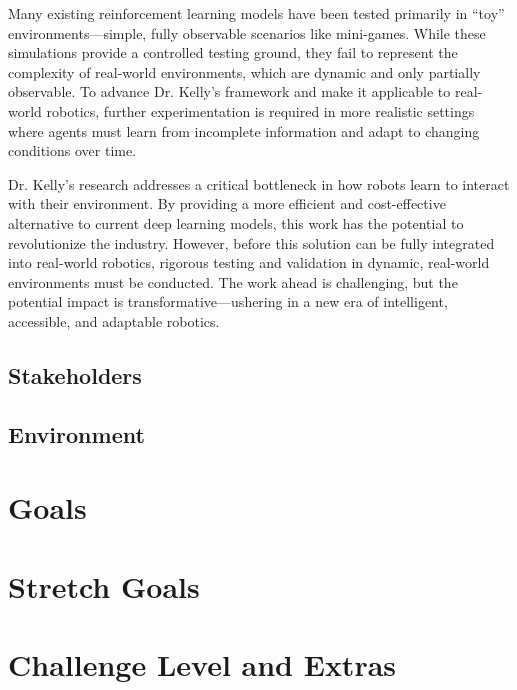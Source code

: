 \documentclass{article}
\begin{document}
Many existing reinforcement learning models have been tested primarily in “toy” environments—simple, fully observable scenarios like mini-games. While these simulations provide a controlled testing ground, they fail to represent the complexity of real-world environments, which are dynamic and only partially observable. To advance Dr. Kelly’s framework and make it applicable to real-world robotics, further experimentation is required in more realistic settings where agents must learn from incomplete information and adapt to changing conditions over time.

Dr. Kelly’s research addresses a critical bottleneck in how robots learn to interact with their environment. By providing a more efficient and cost-effective alternative to current deep learning models, this work has the potential to revolutionize the industry. However, before this solution can be fully integrated into real-world robotics, rigorous testing and validation in dynamic, real-world environments must be conducted. The work ahead is challenging, but the potential impact is transformative—ushering in a new era of intelligent, accessible, and adaptable robotics.

\subsection{Stakeholders}

\subsection{Environment}


\section{Goals}

\section{Stretch Goals}

\section{Challenge Level and Extras}

\end{document}
